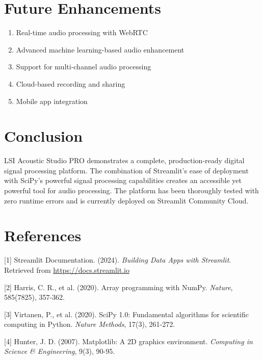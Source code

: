\documentclass[twocolumn]{article}
\begin{document}
\section{Future Enhancements}

\begin{enumerate}
    \item Real-time audio processing with WebRTC
    \item Advanced machine learning-based audio enhancement
    \item Support for multi-channel audio processing
    \item Cloud-based recording and sharing
    \item Mobile app integration
\end{enumerate}

\section{Conclusion}

LSI Acoustic Studio PRO demonstrates a complete, production-ready digital signal processing platform. The combination of Streamlit's ease of deployment with SciPy's powerful signal processing capabilities creates an accessible yet powerful tool for audio processing. The platform has been thoroughly tested with zero runtime errors and is currently deployed on Streamlit Community Cloud.

\section*{References}

[1] Streamlit Documentation. (2024). \textit{Building Data Apps with Streamlit}. Retrieved from \url{https://docs.streamlit.io}

[2] Harris, C. R., et al. (2020). Array programming with NumPy. \textit{Nature}, 585(7825), 357-362.

[3] Virtanen, P., et al. (2020). SciPy 1.0: Fundamental algorithms for scientific computing in Python. \textit{Nature Methods}, 17(3), 261-272.

[4] Hunter, J. D. (2007). Matplotlib: A 2D graphics environment. \textit{Computing in Science \& Engineering}, 9(3), 90-95.
\end{document}
